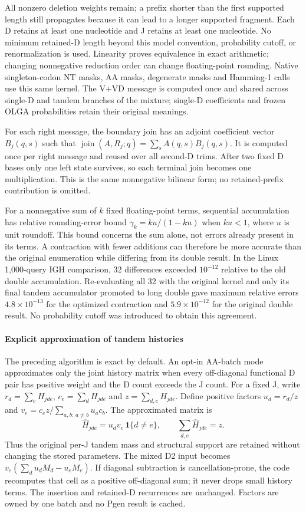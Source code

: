 \documentclass[11pt]{article}
\theoremstyle{oldplain}
\theoremstyle{oldrem}
\begin{document}
All nonzero deletion weights remain; a prefix shorter than the first supported
length still propagates because it can lead to a longer supported fragment.
Each D retains at least one nucleotide and J retains at least one nucleotide.
No minimum retained-D length beyond this model convention, probability cutoff,
or renormalization is used. Linearity proves equivalence in exact arithmetic;
changing nonnegative reduction order can change floating-point rounding.
Native singleton-codon NT masks, AA masks, degenerate masks and Hamming-1 calls
use this same kernel. The V+VD message is computed once and shared across
single-D and tandem branches of the mixture; single-D coefficients and frozen
OLGA probabilities retain their original meanings.

For each right message, the boundary join has an adjoint coefficient vector
$B_j(q,s)$ such that $\operatorname{join}(A,R_j;q)=\sum_s A(q,s)B_j(q,s)$.
It is computed once per right message and reused over all second-D trims.
After two fixed D bases only one left state survives, so each terminal join
becomes one multiplication. This is the same nonnegative bilinear form;
no retained-prefix contribution is omitted.

For a nonnegative sum of $k$ fixed floating-point terms, sequential accumulation
has relative rounding-error bound $\gamma_k=ku/(1-ku)$ when $ku<1$, where
$u$ is unit roundoff. This bound concerns the sum alone, not errors already
present in its terms. A contraction with fewer additions can therefore be more
accurate than the original enumeration while differing from its double result.
In the Linux 1,000-query IGH comparison, 32 differences exceeded $10^{-12}$
relative to the old double accumulation. Re-evaluating all 32 with the original
kernel and only its final tandem accumulator promoted to long double gave
maximum relative errors $4.8\times10^{-13}$ for the optimized contraction and
$5.9\times10^{-12}$ for the original double result. No probability cutoff was
introduced to obtain this agreement.

\paragraph{Explicit approximation of tandem histories}
The preceding algorithm is exact by default. An opt-in AA-batch mode approximates
only the joint history matrix when every off-diagonal functional D pair has positive
weight and the D count exceeds the J count. For a fixed J, write
$r_d=\sum_e H_{jde}$, $c_e=\sum_d H_{jde}$ and $z=\sum_{d,e}H_{jde}$.
Define positive factors $u_d=r_d/z$ and
$v_e=c_e z/\sum_{a,b:\,a\ne b}u_ac_b$. The approximated matrix is
\begin{equation}
 \widehat H_{jde}=u_dv_e\,\mathbf{1}\{d\ne e\},\qquad
 \sum_{d,e}\widehat H_{jde}=z.
\end{equation}
Thus the original per-J tandem mass and structural support are retained without
changing the stored parameters. The mixed D2 input becomes
$v_e(\sum_d u_dM_d-u_eM_e)$. If diagonal subtraction is cancellation-prone, the
code recomputes that cell as a positive off-diagonal sum; it never drops small
history terms. The insertion and retained-D recurrences are unchanged.
Factors are owned by one batch and no Pgen result is cached.
\end{document}
